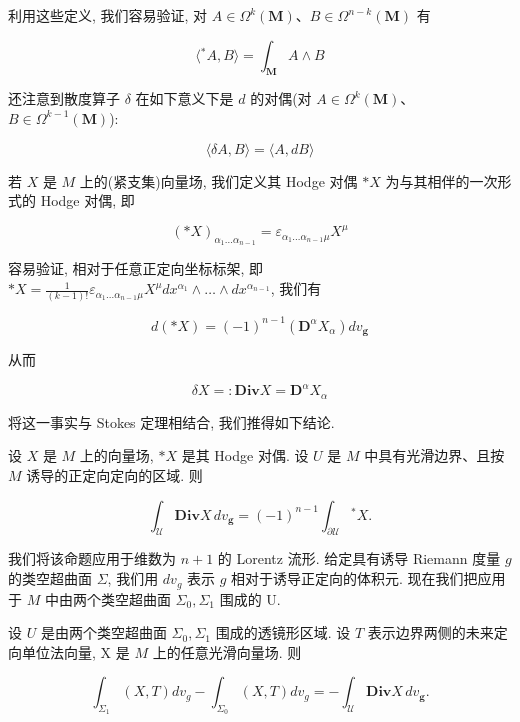利用这些定义, 我们容易验证, 对 $A \in \Omega^k(\mathbf{M})$、$B \in \Omega^{n-k}(\mathbf{M})$ 有

\[
\langle {}^{\ast}A, B\rangle = \int_{\mathbf{M}}A \wedge B
\]

还注意到散度算子 $\delta$ 在如下意义下是 $d$ 的对偶(对 $A \in \Omega^{k}(\mathbf{M})$、$B \in \Omega^{k-1}(\mathbf{M})$):

\[
\langle \delta A, B\rangle = \langle A, dB\rangle
\]

若 $X$ 是 $M$ 上的(紧支集)向量场, 我们定义其 Hodge 对偶 $*X$ 为与其相伴的一次形式的 Hodge 对偶, 即

\[
(\ast X)_{\alpha_{1}\ldots\alpha_{n-1}} = \varepsilon_{\alpha_{1}\ldots\alpha_{n-1}\mu}X^{\mu}
\]

容易验证, 相对于任意正定向坐标标架, 即 $*X = \frac{1}{(k-1)!}\varepsilon_{\alpha_{1}\ldots\alpha_{n-1}\mu}X^{\mu}dx^{\alpha_{1}} \wedge \ldots \wedge dx^{\alpha_{n-1}}$, 我们有

\[
d(*X) = (-1)^{n-1}(\mathbf{D}^{\alpha}X_{\alpha})dv_{\mathbf{g}}
\]

从而

\[
\delta X =: \mathbf{Div}X = \mathbf{D}^{\alpha}X_{\alpha}
\]

将这一事实与 Stokes 定理相结合, 我们推得如下结论.

\begin{proposition}\label{prop:cA-3.6}
设 $X$ 是 $M$ 上的向量场, $\ast X$ 是其 Hodge 对偶. 设 $U$ 是 $M$ 中具有光滑边界、且按 $M$ 诱导的正定向定向的区域. 则

\[
\int_{\mathcal{U}}\mathbf{Div}X\, dv_{\mathbf{g}} = (-1)^{n-1}\int_{\partial\mathcal{U}}{}^{\ast}X.
\]
\end{proposition}

我们将该命题应用于维数为 $n+1$ 的 Lorentz 流形. 给定具有诱导 Riemann 度量 $g$ 的类空超曲面 $\Sigma$, 我们用 $dv_{g}$ 表示 $g$ 相对于诱导正定向的体积元. 现在我们把应用于 $M$ 中由两个类空超曲面 $\Sigma_{0}, \Sigma_{1}$ 围成的 U.

\begin{corollary}\label{cor:cA-3.7}
设 $U$ 是由两个类空超曲面 $\Sigma_{0}, \Sigma_{1}$ 围成的透镜形区域. 设 $T$ 表示边界两侧的未来定向单位法向量, X 是 $M$ 上的任意光滑向量场. 则

\[
\int_{\Sigma_{1}}(X, T)dv_{g} - \int_{\Sigma_{0}}(X, T)dv_{g} = -\int_{\mathcal{U}}\mathbf{Div}X\, dv_{\mathbf{g}}.
\]
\end{corollary}

